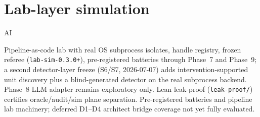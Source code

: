 \section{Lab-layer simulation}
\label{sec:appn-lab-simulation}
\begin{authbar}{AI}

Pipeline-as-code lab with real OS subprocess isolates, handle registry, frozen referee (\texttt{lab-sim-0.3.0+}), pre-registered batteries through Phase~7 and Phase~9; a second detector-layer freeze (S6/S7, 2026-07-07) adds intervention-supported unit discovery plus a blind-generated detector on the real subprocess backend. Phase~8 LLM adapter remains exploratory only. Lean leak-proof (\texttt{leak-proof/}) certifies oracle/audit/sim plane separation. Pre-registered batteries and pipeline lab machinery; deferred D1--D4 architect bridge coverage not yet fully evaluated.

\small
\setlength{\tabcolsep}{3pt}
\renewcommand{\arraystretch}{1.2}
\end{authbar}
